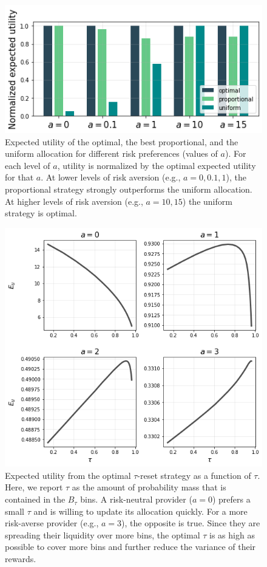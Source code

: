 \documentclass[sigconf, usenames, dvipsnames]{acmart}
\begin{document}
\begin{figure}
    \centering
    \includegraphics[width=\linewidth]{img/utility_comp.png}
    \caption{Expected utility of the optimal, the best proportional, and the uniform allocation for different risk preferences (values of $a$). For each level of $a$, utility is normalized by the optimal expected utility for that $a$. At lower levels of risk aversion (e.g., $a=0,0.1,1$), the proportional strategy strongly outperforms the uniform allocation. At higher levels of risk aversion (e.g., $a=10,15$) the uniform strategy is optimal. 
    \label{fig:utility_comp}}
\end{figure}

\begin{figure}
    \centering
    \includegraphics[width=\linewidth]{img/opt_tau.png}
    \caption{Expected utility from the optimal $\tau$-reset strategy as a function of $\tau$. Here, we report  $\tau$ as the amount of probability mass that is contained in the $B_\tau$ bins. A risk-neutral provider ($a=0$) prefers a small $\tau$ and is willing to update its allocation quickly. For a more risk-averse provider (e.g., $a=3$), the opposite is true. Since they are spreading their liquidity over more bins, the optimal $\tau$ is as high as possible to cover more bins and further reduce the variance of their rewards. 
    \label{fig:opt_tau}}
\end{figure}
\end{document}
